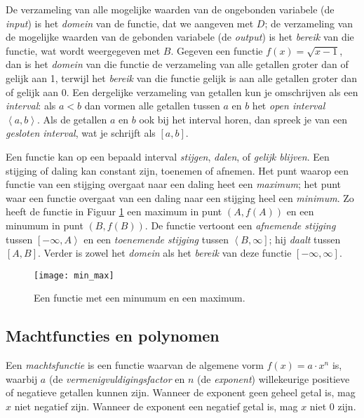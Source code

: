 De verzameling van alle mogelijke waarden van de ongebonden variabele (de \textit{input}) is het \textit{domein} van de functie, dat we aangeven met $D$; de verzameling van de mogelijke waarden van de gebonden variabele (de \textit{output}) is het \textit{bereik} van die functie, wat wordt weergegeven met $B$. Gegeven een functie $f(x)=\sqrt{x-1}$, dan is het \textit{domein} van die functie de verzameling van alle getallen groter dan of gelijk aan 1, terwijl het \textit{bereik} van die functie gelijk is aan alle getallen groter dan of gelijk aan 0. Een dergelijke verzameling van getallen kun je omschrijven als een \textit{interval}: als $a < b$ dan vormen alle getallen tussen $a$ en $b$ het \textit{open interval} $\left<a,b\right>$. Als de getallen $a$ en $b$ ook bij het interval horen, dan spreek je van een \textit{gesloten interval}, wat je schrijft als $\left[a,b\right]$.

Een functie kan op een bepaald interval \textit{stijgen}, \textit{dalen}, of \textit{gelijk blijven}. Een stijging of daling kan constant zijn, toenemen of afnemen. Het punt waarop een functie van een stijging overgaat naar een daling heet een \textit{maximum}; het punt waar een functie overgaat van een daling naar een stijging heel een \textit{minimum}. Zo heeft de functie in Figuur \ref{img:min_max} een maximum in punt $(A, f(A))$ en een minumum in punt $(B, f(B))$. De functie vertoont een \textit{afnemende stijging} tussen $\left[-\infty, A \right>$ en een \textit{toenemende stijging} tussen $\left< B, \infty \right]$; hij \textit{daalt} tussen $\left[A,B\right]$. Verder is zowel het \textit{domein} als het \textit{bereik} van deze functie $\left[-\infty, \infty\right]$.

\begin{figure}[h]
\centering
\texttt{[image: min\_max]}
\caption{Een functie met een minumum en een maximum.\label{img:min_max}}
\end{figure}

\subsection{Machtfuncties en polynomen}

Een \textit{machtsfunctie} is een functie waarvan de algemene vorm $f(x)= a \cdot x^n$ is, waarbij $a$ (de \textit{vermenigvuldigingsfactor} en $n$ (de \textit{exponent}) willekeurige positieve of negatieve getallen kunnen zijn. Wanneer de exponent geen geheel getal is, mag $x$ niet negatief zijn. Wanneer de exponent een negatief getal is, mag $x$ niet 0 zijn. 

